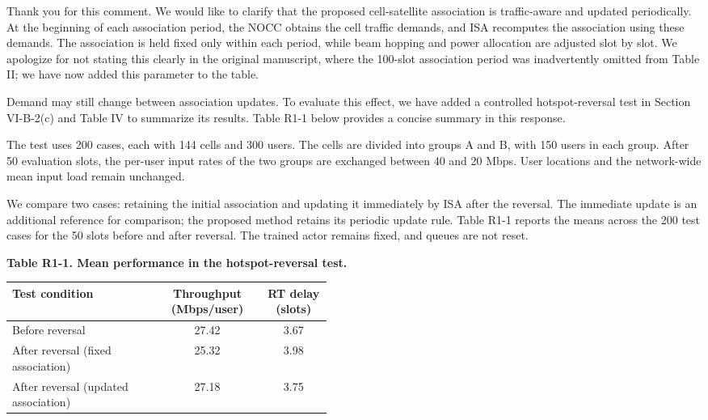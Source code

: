 \documentclass[11pt,a4paper]{article}
\begin{document}
Thank you for this comment. We would like to clarify that the proposed cell-satellite association is traffic-aware and updated periodically. At the beginning of each association period, the NOCC obtains the cell traffic demands, and ISA recomputes the association using these demands. The association is held fixed only within each period, while beam hopping and power allocation are adjusted slot by slot. We apologize for not stating this clearly in the original manuscript, where the 100-slot association period was inadvertently omitted from Table II; we have now added this parameter to the table.
\par

Demand may still change between association updates. To evaluate this effect, we have added a controlled hotspot-reversal test in Section VI-B-2(c) and Table IV to summarize its results. Table R1-1 below provides a concise summary in this response.
\par

The test uses 200 cases, each with 144 cells and 300 users. The cells are divided into groups A and B, with 150 users in each group. After 50 evaluation slots, the per-user input rates of the two groups are exchanged between 40 and 20 Mbps. User locations and the network-wide mean input load remain unchanged.
\par

We compare two cases: retaining the initial association and updating it immediately by ISA after the reversal. The immediate update is an additional reference for comparison; the proposed method retains its periodic update rule. Table R1-1 reports the means across the 200 test cases for the 50 slots before and after reversal. The trained actor remains fixed, and queues are not reset.
\par

\textbf{Table R1-1. Mean performance in the hotspot-reversal test.}
\par

\begin{center}\small\renewcommand{\arraystretch}{1.2}
\begin{tabular}{@{}p{0.46\linewidth}cc@{}}\toprule
Test condition & Throughput (Mbps/user) & RT delay (slots)\\\midrule
Before reversal & 27.42 & 3.67\\
After reversal (fixed association) & 25.32 & 3.98\\
After reversal (updated association) & 27.18 & 3.75\\
\bottomrule\end{tabular}\end{center}
\end{document}
